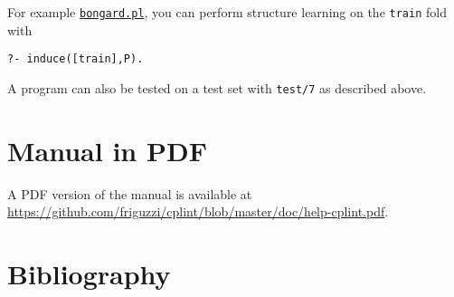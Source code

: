\documentclass[a4paper,10pt]{article}
\begin{document}
For example \href{http://cplint.lamping.unife.it/example/bongard.pl}{\texttt{bongard.pl}}, you can perform structure learning on the \verb|train| fold with 
\begin{verbatim}
?- induce([train],P).
\end{verbatim}
A program can also be tested on a test set with \verb|test/7| as
described above.



\section{Manual in PDF}
A PDF version of the manual is available at
\url{https://github.com/friguzzi/cplint/blob/master/doc/help-cplint.pdf}.
\section{Bibliography}


\end{document}
